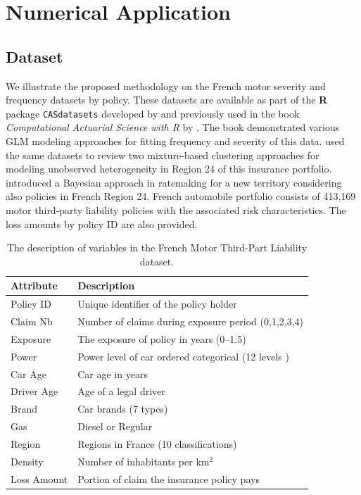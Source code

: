 \documentclass[11pt,letterpaper]{article}
\numberwithin{equation}{section}
\numberwithin{equation}{section}
\numberwithin{equation}{section}
\begin{document}
\section{Numerical Application}
\subsection{Dataset}
We illustrate the proposed methodology on the French motor severity and frequency datasets by policy. These datasets are available as part of the {\bf R} package {\tt CASdatasets} developed by \citep{Dutang+Charpentier:2016} and previously used in the book {\it Computational Actuarial Science with R} by \cite{Charpentier:2014}. The book demonstrated various GLM modeling approaches for fitting frequency and severity of this data. \cite{risks_miljkovic} used the same datasets to review two mixture-based clustering approaches for modeling unobserved heterogeneity in Region 24 of this insurance portfolio. \cite{Zhang+Miljkovic:2018} introduced a Bayesian approach in ratemaking for a new territory considering also policies in French Region 24. French automobile portfolio consists of 413,169 motor third-party liability policies with the associated risk characteristics. The loss amounts by policy ID are also provided.
\begin{small}
\begin{table}[!htb]
\begin{center}
    \caption{The description of variables in the French Motor Third-Part Liability dataset.}
      \centering
        \begin{tabular}{ll}
\hline
Attribute & Description \\
\hline
Policy ID & Unique identifier of the policy holder\\
Claim Nb & Number of claims during exposure period  (0,1,2,3,4)\\
Exposure & The exposure of policy in years (0--1.5) \\
Power & Power level of car ordered categorical (12 levels )\\
Car Age & Car age in years \\
Driver Age & Age of a legal driver \\
Brand & Car brands (7 types) \\
Gas & Diesel or Regular \\
Region & Regions in France (10 classifications)\\
Density & Number of inhabitants per km$^2$ \\
Loss Amount & Portion of claim the insurance policy pays\\
\hline
		\end{tabular}
\end{center}
\end{table}
\end{small}
\end{document}
